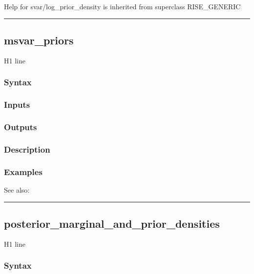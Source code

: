 \documentclass[letterpaper,10pt,english]{sphinxmanual}
\begin{document}
Help for svar/log\_prior\_density is inherited from superclass RISE\_GENERIC


\bigskip\hrule{}\bigskip



\subsection{msvar\_priors}
\label{classes/models/@svar/svar:msvar-priors}\label{classes/models/@svar/svar:id66}
H1 line


\subsubsection{Syntax}
\label{classes/models/@svar/svar:id67}

\subsubsection{Inputs}
\label{classes/models/@svar/svar:id68}

\subsubsection{Outputs}
\label{classes/models/@svar/svar:id69}

\subsubsection{Description}
\label{classes/models/@svar/svar:id70}

\subsubsection{Examples}
\label{classes/models/@svar/svar:id71}
See also:


\bigskip\hrule{}\bigskip



\subsection{posterior\_marginal\_and\_prior\_densities}
\label{classes/models/@svar/svar:id72}\label{classes/models/@svar/svar:posterior-marginal-and-prior-densities}
H1 line


\subsubsection{Syntax}
\label{classes/models/@svar/svar:id73}
\end{document}
